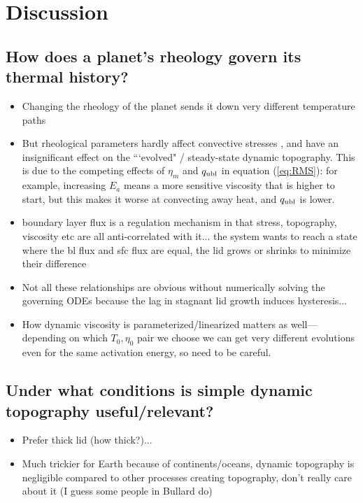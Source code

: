 \section{Discussion}

\subsection{How does a planet's rheology govern its thermal history?}

\begin{itemize}

\item Changing the rheology of the planet sends it down very different temperature paths
\item But rheological parameters hardly affect convective stresses \citep{Reese2005}, and have an insignificant effect on the ```evolved" / steady-state dynamic topography. This is due to the competing effects of $\eta_m$ and $q_{\rm ubl}$ in equation (\ref{eq:RMS}): for example, increasing $E_a$ means a more sensitive viscosity that is higher to start, but this makes it worse at convecting away heat, and $q_{\rm ubl}$ is lower.
\item boundary layer flux is a regulation mechanism in that stress, topography, viscosity etc are all anti-correlated with it... the system wants to reach a state where the bl flux and sfc flux are equal, the lid grows or shrinks to minimize their difference
\item Not all these relationships are obvious without numerically solving the governing ODEs because the lag in stagnant lid growth induces hysteresis...
\item How dynamic viscosity is parameterized/linearized matters as well---depending on which $T_0, \eta_0$ pair we choose we can get very different evolutions even for the same activation energy, so need to be careful.
\end{itemize}

\subsection{Under what conditions is simple dynamic topography useful/relevant?}


\begin{itemize}
\item Prefer thick lid (how thick?)...
\item Much trickier for Earth because of continents/oceans, dynamic topography is negligible compared to other processes creating topography, don't really care about it (I guess some people in Bullard do)
\end{itemize}